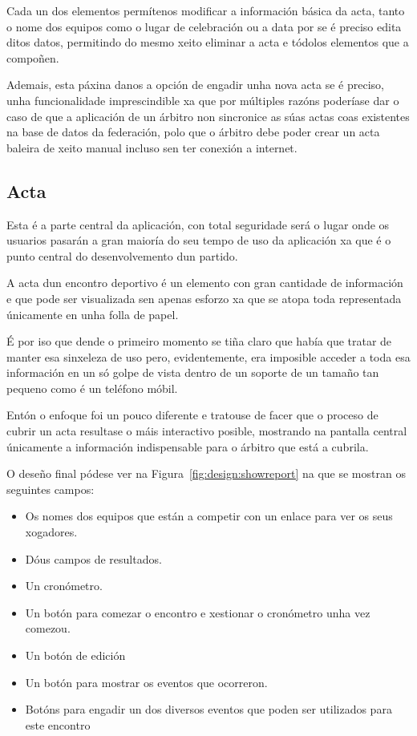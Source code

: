     Cada un dos elementos permítenos modificar a información 
básica da acta, tanto o nome dos equipos como o lugar de celebración ou a data 
por se é preciso edita ditos datos, permitindo do mesmo xeito eliminar a acta e 
tódolos elementos que a compoñen.

    Ademais, esta páxina danos a opción de engadir unha nova acta se é preciso, 
unha funcionalidade imprescindible xa que por múltiples razóns 
poderíase dar o caso de que a aplicación de un árbitro non sincronice as súas 
actas coas existentes na base 
de datos da federación, polo que o árbitro debe poder crear un acta baleira de 
xeito manual incluso sen ter conexión a internet.

    \subsection{Acta}
    Esta é a parte central da aplicación, con total seguridade será o lugar 
onde os usuarios pasarán a gran maioría do seu tempo de uso da aplicación xa 
que é o punto central do desenvolvemento dun partido.

    A acta dun encontro deportivo é un elemento con gran cantidade de 
información e que pode ser visualizada sen apenas esforzo xa que se atopa 
toda representada únicamente en unha folla de papel.

    É por iso que dende o primeiro momento se tiña claro que había que tratar 
de manter esa sinxeleza de uso pero, evidentemente, era imposible acceder a 
toda esa información en un só golpe de vista dentro de un soporte de un tamaño 
tan pequeno como é un teléfono móbil.

    Entón o enfoque foi un pouco diferente e tratouse de facer que o proceso de 
cubrir un acta resultase o máis interactivo posible, mostrando na pantalla 
central únicamente a información indispensable para o árbitro que está a 
cubrila.

    O deseño final pódese ver na Figura~\ref{fig:design:showreport} na que se 
mostran os seguintes campos:
    \begin{itemize}
     \item Os nomes dos equipos que están a competir con un enlace para ver os 
seus xogadores.
     \item Dóus campos de resultados.
     \item Un cronómetro.
     \item Un botón para comezar o encontro e xestionar o cronómetro unha vez 
comezou.
     \item Un botón de edición
     \item Un botón para mostrar os eventos que 
ocorreron.
     \item Botóns para engadir un dos diversos eventos que poden ser utilizados 
para este encontro
    \end{itemize}

